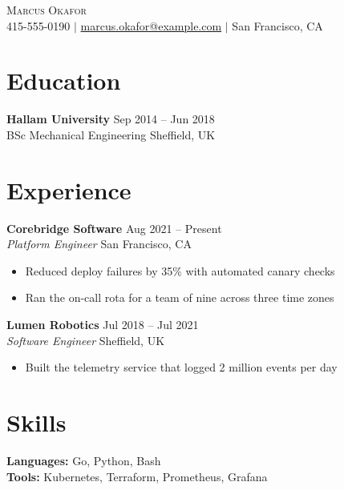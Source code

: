 \documentclass[letterpaper,11pt]{article}
\begin{document}
\begin{center}
  {\Huge \scshape Marcus Okafor} \\[3pt]
  \small 415-555-0190 $|$ \href{mailto:marcus.okafor@example.com}{marcus.okafor@example.com} $|$ San Francisco, CA
\end{center}

\section{Education}
\textbf{Hallam University} \hfill Sep 2014 -- Jun 2018 \\
BSc Mechanical Engineering \hfill Sheffield, UK

\section{Experience}
\textbf{Corebridge Software} \hfill Aug 2021 -- Present \\
\textit{Platform Engineer} \hfill San Francisco, CA
\begin{itemize}
  \item Reduced deploy failures by 35\% with automated canary checks
  \item Ran the on-call rota for a team of nine across three time zones
\end{itemize}

\textbf{Lumen Robotics} \hfill Jul 2018 -- Jul 2021 \\
\textit{Software Engineer} \hfill Sheffield, UK
\begin{itemize}
  \item Built the telemetry service that logged 2 million events per day
\end{itemize}

\section{Skills}
\textbf{Languages:} Go, Python, Bash \\
\textbf{Tools:} Kubernetes, Terraform, Prometheus, Grafana
\end{document}
